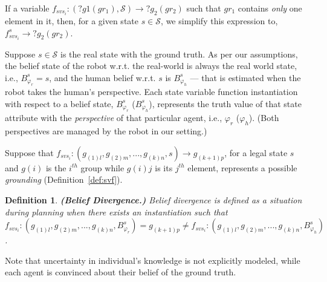 \documentclass[letterpaper]{article} %
\newtheorem{definition}{Definition}
\begin{document}
If a variable $f_{svs_i}: (?g1 (gr_1), \mathcal{S}) \rightarrow ?g_2 (gr_2)$ such that $gr_1$ contains \textit{only} one element in it, then, for a given state $s \in \mathcal{S}$, we simplify this expression to, $f_{svs_i}^{s} \rightarrow ?g_2 (gr_2)$. 

Suppose $s \in \mathcal{S}$ is the real state with the ground truth. As per our assumptions, the belief state of the robot w.r.t. the real-world is always the real world state, i.e., $B_{\varphi_r}^s = s$, and the human belief w.r.t. $s$ is $B_{\varphi_h}^s$ --- that is estimated when the robot takes the human's perspective. Each state variable function instantiation with respect to a belief state, $B_{\varphi_r}^s$ ($B_{\varphi_h}^s$), represents the truth value of that state attribute with the \textit{perspective} of that particular agent, i.e., $\varphi_r$ ($\varphi_h$). (Both perspectives are managed by the robot in our setting.) 

Suppose that $f_{\textit{svs}_i}:(g_{(1)l},g_{(2)m},...,g_{(k)n},s) \rightarrow g_{(k+1)p}$, for a legal state $s$ and $g(i)$ is the $i^{th}$ group while $g(i)j$ is its $j^{th}$ element, represents a possible {\em grounding} (Definition~\ref{def:svf}).

\begin{definition} \label{def:bd}
\textbf{(Belief Divergence.)}
Belief divergence is defined as a situation during planning when there exists an instantiation such that $f_{\textit{svs}_i}:(g_{(1)l},g_{(2)m},...,g_{(k)n},B_{\varphi_r}^s) = {g_{(k+1)p}}  \neq f_{\textit{svs}_i}:(g_{(1)l},g_{(2)m},...,g_{(k)n},B_{\varphi_h}^s)$.
\end{definition} 

Note that uncertainty in individual's knowledge is not explicitly modeled, while each agent is convinced about their belief of the ground truth.
\end{document}
